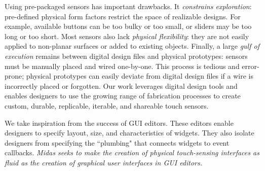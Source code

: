 Using pre-packaged sensors has important drawbacks. It {\em constrains exploration}: pre-defined physical form factors restrict the space of realizable designs. For example, available buttons can be too bulky or too small, or sliders may be too long or too short. Most sensors also lack {\em physical flexibility}: they are not easily applied to non-planar surfaces or added to existing objects. Finally, a large {\em gulf of execution} remains between digital design files and physical prototypes: sensors must be manually placed and wired one-by-one. This process is tedious and error-prone; physical prototypes can easily deviate from digital design files if a wire is incorrectly placed or forgotten. %
Our work leverages digital design tools and enables designers to use the growing range of fabrication processes to create custom, durable, replicable, iterable, and shareable touch sensors.

We take inspiration from the success of GUI editors. These editors enable designers to specify layout, size, and characteristics of widgets. They also isolate designers from specifying the ``plumbing" that connects widgets to event callbacks. {\em Midas seeks to make the creation of physical touch-sensing interfaces as fluid as the creation of graphical user interfaces in GUI editors.}

